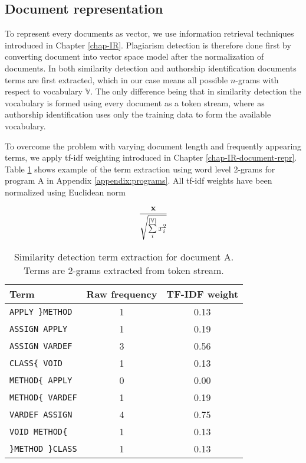 \subsection{Document representation}

To represent every documents as vector, we use information retrieval techniques introduced in Chapter \ref{chap-IR}. Plagiarism detection is therefore done first by converting document into vector space model after the normalization of documents. In both similarity detection and authorship identification documents terms are first extracted, which in our case means all possible $n$-grams with respect to vocabulary $\mathbb{V}$. The only difference being that in similarity detection the vocabulary is formed using every document as a token stream, where as authorship identification uses only the training data to form the available vocabulary. 

To overcome the problem with varying document length and frequently appearing terms, we apply tf-idf weighting introduced in Chapter \ref{chap-IR-document-repr}. Table \ref{tbl-ngram-sd} shows example of the term extraction using word level 2-grams for program A in Appendix \ref{appendix:programs}. All tf-idf weights have been normalized using Euclidean norm 

\begin{equation}
    \dfrac{\mathbf{x}}
          {\sqrt{\sum \limits_i^{|\mathbb{V}|} x_i^2}}
\end{equation}


\begin{table}[ht]
\centering
\caption{Similarity detection term extraction for document A. Terms are 2-grams extracted from token stream.}
\label{tbl-ngram-sd}
\begin{tabular}{l|c|c}
\bf Term & \bf Raw frequency & \bf TF-IDF weight \\ \hline
    \texttt{APPLY \}METHOD} & 1 & 0.13\\
    \texttt{ASSIGN APPLY} & 1 & 0.19\\
    \texttt{ASSIGN VARDEF} & 3 & 0.56\\
    \texttt{CLASS\{ VOID} & 1 & 0.13\\
    \texttt{METHOD\{ APPLY} & 0 & 0.00\\
    \texttt{METHOD\{ VARDEF} & 1 & 0.19\\
    \texttt{VARDEF ASSIGN} & 4 & 0.75\\
    \texttt{VOID METHOD\{} & 1 & 0.13\\
    \texttt{\}METHOD \}CLASS} & 1 & 0.13\\
\end{tabular}
\end{table}

